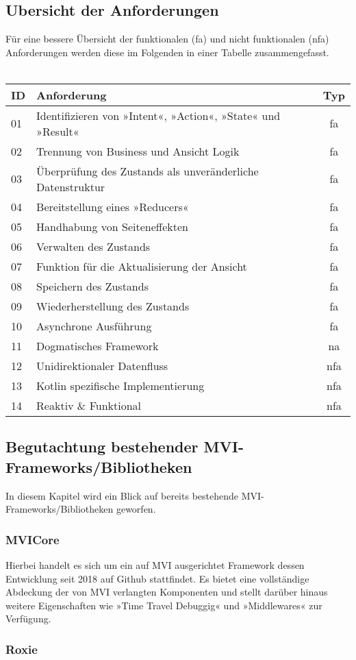 \subsection{Ubersicht der Anforderungen}
Für eine bessere Übersicht der funktionalen (fa) und nicht funktionalen (nfa) Anforderungen werden diese im Folgenden in einer Tabelle zusammengefasst.
\\
\\
\begingroup
\setlength{\tabcolsep}{10pt} %
\renewcommand{\arraystretch}{1.5} %
\begin{tabular}{ | l | l | c | }
	\hline
	ID & Anforderung & Typ
	\\
	\hline
	01 & Identifizieren von »Intent«, »Action«, »State« und »Result« & fa
	\\
	\hline	
	02 & Trennung von Business und Ansicht Logik & fa
	\\
	\hline
	03 & Überprüfung des Zustands als unveränderliche Datenstruktur & fa
	\\
	\hline
	04 & Bereitstellung eines »Reducers« & fa
	\\
	\hline
	05 & Handhabung von Seiteneffekten & fa 
	\\
	\hline
	06 & Verwalten des Zustands & fa 
	\\
	\hline
	07 & Funktion für die Aktualisierung der Ansicht & fa
	\\
	\hline
	08 & Speichern des Zustands & fa
	\\
	\hline
	09 & Wiederherstellung des Zustands & fa
	\\
	\hline
	10 & Asynchrone Ausführung & fa
	\\
	\hline
	11 & Dogmatisches Framework & na
	\\
	\hline
	12 & Unidirektionaler Datenfluss & nfa
	\\
	\hline
	13 & Kotlin spezifische Implementierung & nfa
	\\
	\hline
	14 & Reaktiv \& Funktional & nfa
	\\
	\hline
\end{tabular}
\endgroup

\subsection{Begutachtung bestehender MVI-Frameworks/Bibliotheken}
In diesem Kapitel wird ein Blick auf bereits bestehende MVI-Frameworks/Bibliotheken geworfen.

\subsubsection{MVICore}
Hierbei handelt es sich um ein auf MVI ausgerichtet Framework dessen Entwicklung seit 2018 auf Github stattfindet.
\cite{mviCoreGithub}
Es bietet eine vollständige Abdeckung der von MVI verlangten Komponenten und stellt darüber hinaus weitere Eigenschaften wie »Time Travel Debuggig« und »Middlewares« zur Verfügung.

\subsubsection{Roxie}
